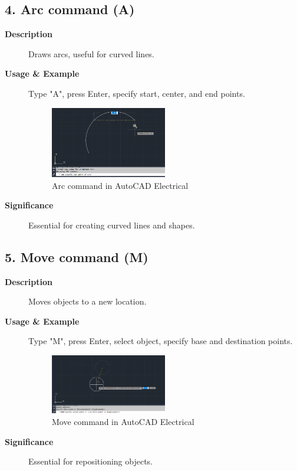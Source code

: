 \documentclass[12pt]{article}
\begin{document}
\subsection*{4. Arc command (A)}
\begin{description}
    \item [\textbf{Description}] Draws arcs, useful for curved lines.
    \item [\textbf{Usage \& Example}] Type "A", press Enter, specify start, center, and end points.
          \begin{figure}[H]
              \centering
              \includegraphics[width=0.5\textwidth]{arc_command.png}
              \caption{Arc command in AutoCAD Electrical}
          \end{figure}
    \item [\textbf{Significance}] Essential for creating curved lines and shapes.
\end{description}

\subsection*{5. Move command (M)}
\begin{description}
    \item [\textbf{Description}] Moves objects to a new location.
    \item [\textbf{Usage \& Example}] Type "M", press Enter, select object, specify base and destination points.
          \begin{figure}[H]
              \centering
              \includegraphics[width=0.5\textwidth]{move_command.png}
              \caption{Move command in AutoCAD Electrical}
          \end{figure}
    \item [\textbf{Significance}] Essential for repositioning objects.
\end{description}
\end{document}
